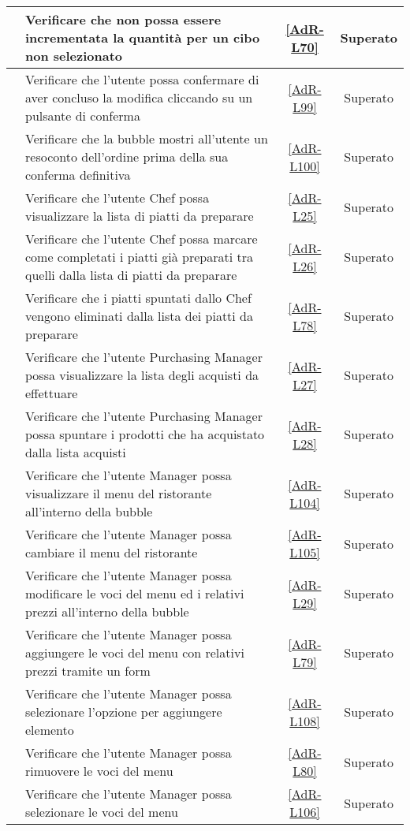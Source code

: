 \begin{longtable}{|c|P{9cm}|c|c|}
	\hline {} & Verificare che non possa essere incrementata la quantità per un cibo non selezionato & \ref{AdR-L70} & Superato \\
	\hline {} & Verificare che l'utente possa confermare di aver concluso la modifica cliccando su un pulsante di conferma & \ref{AdR-L99} & Superato \\
	\hline {} & Verificare che la bubble mostri all'utente un resoconto dell'ordine prima della sua conferma definitiva & \ref{AdR-L100} & Superato \\
	\hline {} & Verificare che l'utente Chef possa visualizzare la lista di piatti da preparare & \ref{AdR-L25} & Superato \\
	\hline {} & Verificare che l'utente Chef possa marcare come completati i piatti già preparati tra quelli dalla lista di piatti da preparare  & \ref{AdR-L26} & Superato \\
	\hline {} & Verificare che i piatti spuntati dallo Chef vengono eliminati dalla lista dei piatti da preparare & \ref{AdR-L78} & Superato \\
	\hline {} & Verificare che l'utente Purchasing Manager possa visualizzare la lista degli acquisti da effettuare & \ref{AdR-L27} & Superato \\
	\hline {} & Verificare che l'utente Purchasing Manager possa spuntare i prodotti che ha acquistato dalla lista acquisti & \ref{AdR-L28} & Superato \\
	\hline {} & Verificare che l'utente Manager possa visualizzare il menu del ristorante all’interno della bubble & \ref{AdR-L104}  & Superato \\
	\hline {} & Verificare che l'utente Manager possa cambiare il menu del ristorante & \ref{AdR-L105} & Superato \\
	\hline {} & Verificare che l'utente Manager possa modificare le voci del menu ed i relativi prezzi all’interno della bubble & \ref{AdR-L29} & Superato \\
	\hline {} & Verificare che l'utente Manager possa aggiungere le voci del menu con relativi prezzi tramite un form & \ref{AdR-L79} & Superato \\
	\hline {} & Verificare che l'utente Manager possa selezionare l'opzione per aggiungere elemento & \ref{AdR-L108} & Superato \\
	\hline {} & Verificare che l'utente Manager possa rimuovere le voci del menu & \ref{AdR-L80} & Superato \\
	\hline {} & Verificare che l'utente Manager possa selezionare le voci del menu & \ref{AdR-L106} & Superato \\

\end{longtable}
